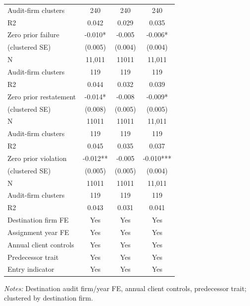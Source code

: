 \begin{table}[htbp]
\begin{threeparttable}
\begin{tabular}{p{}ccc}
Audit-firm clusters & 240 & 240 & 240 \\
R2 & 0.042 & 0.029 & 0.035 \\
Zero prior failure & -0.010* & -0.005 & -0.006* \\
(clustered SE) & (0.005) & (0.004) & (0.004) \\
N & 11,011 & 11011 & 11,011 \\
Audit-firm clusters & 119 & 119 & 119 \\
R2 & 0.044 & 0.032 & 0.039 \\
Zero prior restatement & -0.014* & -0.008 & -0.009* \\
(clustered SE) & (0.008) & (0.005) & (0.005) \\
N & 11011 & 11011 & 11,011 \\
Audit-firm clusters & 119 & 119 & 119 \\
R2 & 0.045 & 0.035 & 0.037 \\
Zero prior violation & -0.012** & -0.005 & -0.010*** \\
(clustered SE) & (0.005) & (0.005) & (0.004) \\
N & 11011 & 11011 & 11,011 \\
Audit-firm clusters & 119 & 119 & 119 \\
R2 & 0.043 & 0.031 & 0.041 \\
Destination firm FE & Yes & Yes & Yes \\
Assignment year FE & Yes & Yes & Yes \\
Annual client controls & Yes & Yes & Yes \\
Predecessor trait & Yes & Yes & Yes \\
Entry indicator & Yes & Yes & Yes \\
\bottomrule
\end{tabular}
\begin{tablenotes}\footnotesize
\item \raggedright \textit{Notes:} Destination audit firm/year FE, annual client controls, predecessor trait; clustered by destination firm.
\end{tablenotes}
\end{threeparttable}
\end{table}

